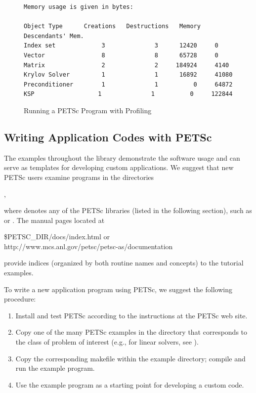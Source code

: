\begin{figure}[H]
{\begin{verbatim}
Memory usage is given in bytes:

Object Type      Creations   Destructions   Memory  Descendants' Mem.
Index set             3              3      12420     0
Vector                8              8      65728     0
Matrix                2              2     184924     4140
Krylov Solver         1              1      16892     41080
Preconditioner        1              1          0     64872
KSP                  1              1          0     122844

\end{verbatim}
}
\nobreak
\caption{Running a PETSc Program with Profiling}
\label{fig_exprof}
\end{figure}

\subsection*{Writing Application Codes with PETSc}

The examples throughout the library demonstrate the software usage
and can serve as templates for developing
custom applications.  We suggest that new PETSc
users examine programs in the directories 
\begin{tabbing}
  ,
\end{tabbing}
where 
denotes any of the PETSc libraries (listed in the following
section), such as  or .  
The manual pages located at
\begin{tabbing}
   \${PETSC\_DIR}/docs/index.html or \\
   http://www.mcs.anl.gov/petsc/petsc-as/documentation
\end{tabbing}
provide indices (organized by both routine names and concepts) to the tutorial examples.

To write a new application program using PETSc, we suggest the
following procedure:
\begin{enumerate}
\item Install and test PETSc according to the instructions at the PETSc web site.
\item Copy one of the many PETSc examples in the directory
      that corresponds to the class of problem of interest (e.g.,
      for linear solvers, see ).
\item Copy the corresponding makefile within the example directory;
      compile and run the example program.
\item Use the example program as a starting point for developing a custom code.
\end{enumerate}

